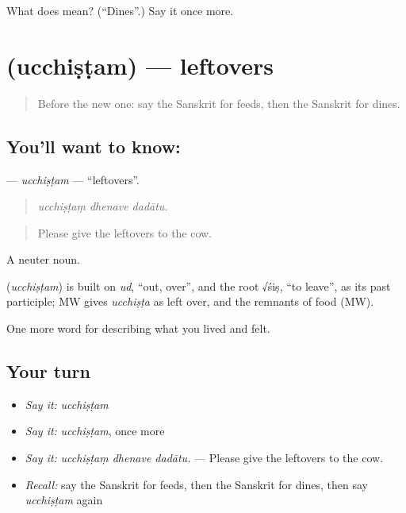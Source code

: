 \begin{tcolorbox}[breakable,colback=teal!4,colframe=teal!35!black,title={Before you move on}]
What does  mean? (\textquotedblleft{}Dines\textquotedblright{}.) Say it once more.
\end{tcolorbox}
\section[\texorpdfstring{\sk{उच्छिष्टम्} (ucchiṣṭam)}{उच्छिष्टम् (ucchiṣṭam)}]{ (ucchiṣṭam) — leftovers}

\label{lesson:SA-C514-ucchistam}



\begin{quote}
Before the new one: say the Sanskrit for feeds, then the Sanskrit for dines.
\end{quote}

\subsection*{You'll want to know: }
\textbf{} — \emph{ucchiṣṭam} — \textquotedblleft{}leftovers\textquotedblright{}.

\begin{quote}
  
\end{quote}

\begin{quote}
\emph{ucchiṣṭaṃ dhenave dadātu.}
\end{quote}

\begin{quote}
Please give the leftovers to the cow.
\end{quote}

A neuter noun.

\begin{cousinweb}
\textbf{} (\emph{ucchiṣṭam}) is built on \emph{ud}, \textquotedblleft{}out, over\textquotedblright{}, and the root √śiṣ, \textquotedblleft{}to leave\textquotedblright{}, as its past participle; MW gives \emph{ucchiṣṭa} as left over, and the remnants of food (MW).
\end{cousinweb}

\begin{grammarlens}[title={What you've built}]
One more word for describing what you lived and felt.
\end{grammarlens}

\subsection*{Your turn}
\begin{itemize}
\raggedright
  \item \emph{Say it:} \emph{ucchiṣṭam}
  \item \emph{Say it:} \emph{ucchiṣṭam}, once more
  \item \emph{Say it:} \emph{ucchiṣṭaṃ dhenave dadātu.} — Please give the leftovers to the cow.
  \item \emph{Recall:} say the Sanskrit for feeds, then the Sanskrit for dines, then say \emph{ucchiṣṭam} again
\end{itemize}


